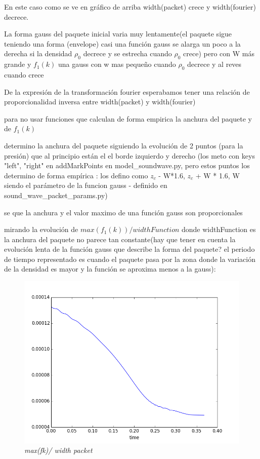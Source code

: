 \documentclass{article}
\begin{document}
\begin{description}
\item En este caso como se ve en gráfico de arriba width(packet) crece y width(fourier) decrece.
\item La forma gauss del paquete inicial varia muy lentamente(el paquete sigue teniendo una forma (envelope) casi una función gauss se alarga un poco a la derecha si 
la densidad $\rho_0$ decrece y se estrecha  cuando $\rho_0$ crece) 
pero con W más grande y $f_1(k)$ una gauss con w mas pequeño cuando $\rho_0$ decrece y al reves cuando crece
\item De la expresión de la transformación fourier 
esperabamos tener una relación de proporcionalidad inversa entre width(packet) y width(fourier)
\item para no usar funciones que calculan de forma empirica la anchura del paquete  y de  $f_1(k)$ 
\begin{description}
\item determino la anchura del paquete siguiendo la evolución de 2 puntos (para la presión) que al principio están el el borde izquierdo y derecho (los meto con keys "left", "right"  en addMarkPoints en model\_soundwave.py, pero estos puntos los determino de forma empírica : los defino como $z_c$ - W*1.6,  $z_c$ + W * 1.6, W siendo el parámetro de la funcion gauss - definido en sound\_wave\_packet\_params.py) 
\item se que la anchura y el valor maximo de una función gauss son proporcionales 
\item mirando la evolución de $max(f_1(k))/widthFunction$ donde widthFunction es la anchura del paquete
no parece tan constante(hay que tener en cuenta la evolución lenta de la función gauss  que describe la forma del paquete? el periodo de tiempo representado es cuando el paquete pasa por la zona donde la variación de la densidad es mayor y la función se aproxima menos a la gauss):

\end{description}

\item \begin{figure}[!ht]
 \centering
 \includegraphics[scale=0.3]{wwinhom1.png}
 \caption{\emph{max(fk)/ width packet}}
\end{figure}




\end{description}
\end{document}
